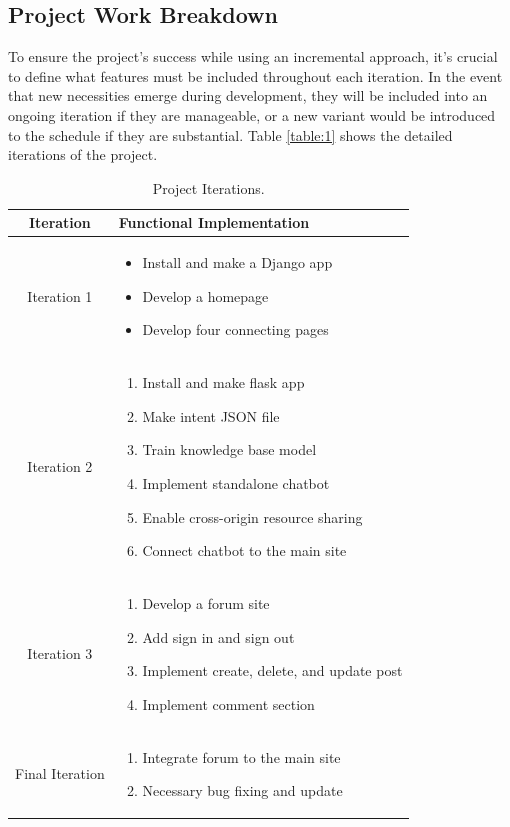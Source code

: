 \subsection{Project Work Breakdown}
To ensure the project's success while using an incremental approach, it's crucial to define what features must be included throughout each iteration. In the event that new necessities emerge during development, they will be included into an ongoing iteration if they are manageable, or a new variant would be introduced to the schedule if they are substantial. Table \ref{table:1} shows the detailed iterations of the project.
\begin{table}[!h]
	\centering
	\begin{tabular}{|c|p{10cm}|} 
		\hline
		Iteration & Functional Implementation \\
		\hline
		Iteration 1 & \begin{itemize}[label=$\ast$] 
			\item Install and make a Django app
			\item Develop a homepage
			\item Develop four connecting pages
		\end{itemize} \\ 
		\hline
		Iteration 2 & \begin{enumerate}[label=$\ast$]
			\item Install and make flask app
			\item Make intent JSON file
			\item Train knowledge base model
			\item Implement standalone chatbot
			\item Enable cross-origin resource sharing
			\item Connect chatbot to the main site
		\end{enumerate} \\ 
		\hline
		Iteration 3 & \begin{enumerate}[label=$\ast$]
			\item Develop a forum  site
			\item Add sign in and sign out
			\item Implement create, delete, and update post
			\item Implement comment section
		\end{enumerate} \\ 
		\hline
		Final Iteration & \begin{enumerate}[label=$\ast$]
			\item Integrate forum to the main site
			\item Necessary bug fixing and update
		\end{enumerate} \\
		\hline
	\end{tabular}
	\caption{Project Iterations.}
	\label{table:2}
\end{table}

